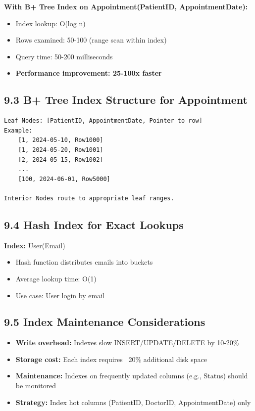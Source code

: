 \textbf{With B+ Tree Index on Appointment(PatientID, AppointmentDate):}
\begin{itemize}
    \item Index lookup: O(log n)
    \item Rows examined: 50-100 (range scan within index)
    \item Query time: 50-200 milliseconds
    \item \textbf{Performance improvement: 25-100x faster}
\end{itemize}

\subsection*{9.3 B+ Tree Index Structure for Appointment}

\begin{verbatim}
Leaf Nodes: [PatientID, AppointmentDate, Pointer to row]
Example:
    [1, 2024-05-10, Row1000]
    [1, 2024-05-20, Row1001]
    [2, 2024-05-15, Row1002]
    ...
    [100, 2024-06-01, Row5000]

Interior Nodes route to appropriate leaf ranges.
\end{verbatim}

\subsection*{9.4 Hash Index for Exact Lookups}

\textbf{Index:} User(Email)

\begin{itemize}
    \item Hash function distributes emails into buckets
    \item Average lookup time: O(1)
    \item Use case: User login by email
\end{itemize}

\subsection*{9.5 Index Maintenance Considerations}

\begin{itemize}
    \item \textbf{Write overhead:} Indexes slow INSERT/UPDATE/DELETE by 10-20\%
    \item \textbf{Storage cost:} Each index requires ~20\% additional disk space
    \item \textbf{Maintenance:} Indexes on frequently updated columns (e.g., Status) should be monitored
    \item \textbf{Strategy:} Index hot columns (PatientID, DoctorID, AppointmentDate) only
\end{itemize}

